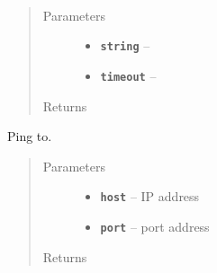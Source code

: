\documentclass[letterpaper,10pt,english]{sphinxmanual}
\begin{document}

\begin{fulllineitems}
\label{RRtoolbox.lib:RRtoolbox.lib.serverServices.parseString}~\begin{quote}\begin{description}
\item[{Parameters}] \leavevmode\begin{itemize}
\item {} 
\textbf{\texttt{string}} -- 

\item {} 
\textbf{\texttt{timeout}} -- 

\end{itemize}

\item[{Returns}] \leavevmode


\end{description}\end{quote}

\end{fulllineitems}


\begin{fulllineitems}
\label{RRtoolbox.lib:RRtoolbox.lib.serverServices.ping}
Ping to.
\begin{quote}\begin{description}
\item[{Parameters}] \leavevmode\begin{itemize}
\item {} 
\textbf{\texttt{host}} -- IP address

\item {} 
\textbf{\texttt{port}} -- port address

\end{itemize}

\item[{Returns}] \leavevmode


\end{description}\end{quote}

\end{fulllineitems}

\end{document}
